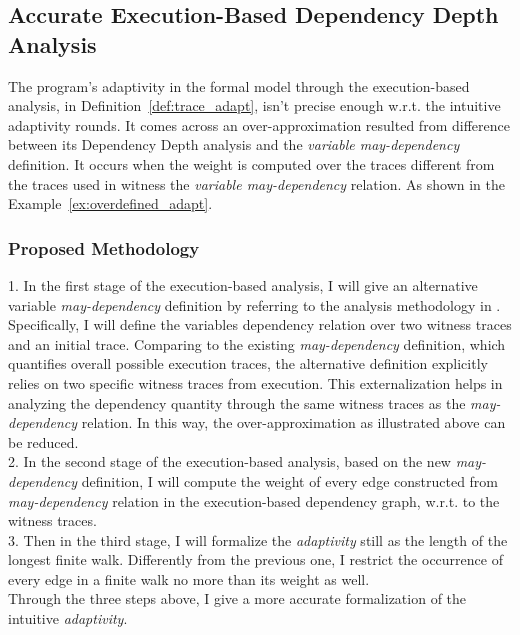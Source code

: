\subsection{Accurate Execution-Based Dependency Depth Analysis}
\label{subsec:furthers-dep-depth}
%
The program's adaptivity in the formal model through the execution-based analysis,
in Definition~\ref{def:trace_adapt}, isn't precise enough w.r.t. the intuitive adaptivity rounds.
It comes across an over-approximation 
resulted from difference between its Dependency Depth analysis and the \emph{variable may-dependency} definition.
It occurs when the weight is computed over the traces different from the traces used in 
witness the \emph{variable may-dependency} relation.
As shown in the Example~\ref{ex:overdefined_adapt}.

\subsubsection{Proposed Methodology}
\label{subsubsec:furthers-dep-depth}
% 
1. In the first stage of the execution-based analysis, 
I will give an alternative variable \emph{may-dependency} definition 
by referring to the analysis methodology in \cite{Cousot19a}.
\\
Specifically, I will define the variables dependency relation over two witness traces and an initial trace. Comparing to 
the existing \emph{may-dependency} definition, which quantifies overall possible execution traces, the alternative
definition explicitly relies on two specific witness traces from execution.
This externalization helps in analyzing the dependency quantity through the same 
witness traces as the \emph{may-dependency} relation. In this way, the over-approximation as illustrated above
can be reduced.
\\
2. In the second stage of the execution-based analysis, 
based on the new \emph{may-dependency} definition,
I will compute the weight of every edge constructed from 
\emph{may-dependency} relation in the execution-based dependency graph, w.r.t. to the witness traces.
\\
3. Then in the third stage, I will formalize the \emph{adaptivity} still as the 
length of the longest finite walk. Differently from the previous one, I restrict 
the occurrence of every edge in a finite walk no more than its weight as well.
\\
Through the three steps above, I give a more accurate formalization of the intuitive \emph{adaptivity}.
%
